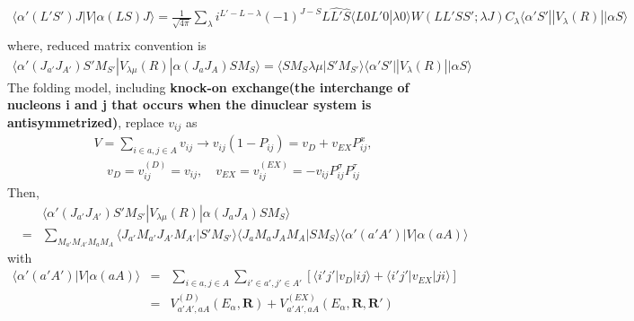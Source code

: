 \documentclass[11pt]{book}
\def\bm{\boldsymbol}
\def\vR{{\bm R}}
\def\la{\langle}
\def\ra{\rangle}
\newcommand{\bea}{\begin{eqnarray}}
\newcommand{\eea}{\end{eqnarray}}
\newcommand{\no}{\nonumber \\}
\begin{document}
\bea 
\la \alpha'(L'S')J|V|\alpha(LS)J\ra 
=\frac{1}{\sqrt{4\pi}}\sum_{\lambda} i^{L'-L-\lambda}(-1)^{J-S}\hat{L}\hat{L'}\hat{S}
 \la L 0 L' 0|\lambda 0\ra W(LL'SS';\lambda J) C_\lambda \la \alpha' S'||V_\lambda(R)||\alpha S\ra 
 \no 
\eea 
where, reduced matrix convention is 
\bea 
\la \alpha'(J_{a'}J_{A'})S' M_{S'}|V_{\lambda \mu}(R)|\alpha(J_a J_A) S M_S\ra 
=\la S M_S \lambda \mu|S' M_{S'}\ra 
  \la \alpha' S'||V_\lambda(R)||\alpha S\ra 
\eea 
The folding model, including {\bf knock-on exchange(the interchange of nucleons i and j that occurs when the dinuclear system is antisymmetrized)}, replace $v_{ij}$ as  
\bea 
V=\sum_{i\in a,j\in A} v_{ij} \to v_{ij}(1-P_{ij})=v_D+v_{EX} P^x_{ij}, 
\eea 
\bea 
v_D=v_{ij}^{(D)}=v_{ij},\quad v_{EX}=v_{ij}^{(EX)}=-v_{ij}P^\sigma_{ij} P^\tau_{ij}
\eea 
Then,
\bea 
& &\la \alpha'(J_{a'}J_{A'})S' M_{S'}|V_{\lambda \mu}(R)|\alpha(J_a J_A) S M_S\ra 
\no 
&=&\sum_{M_{a'} M_{A'} M_a M_A}
 \la J_{a'} M_{a'} J_{A'} M_{A'}|S' M_{S'}\ra \la J_{a} M_{a} J_{A} M_{A}|S M_{S}\ra
 \la \alpha'(a'A')|V|\alpha(a A)\ra 
\eea 
with
\bea 
\la \alpha'(a' A')|V|\alpha(aA)\ra 
&=& \sum_{i\in a, j\in A}\sum_{i'\in a',j'\in A'}
    [\la i'j'|v_D|ij\ra +\la i' j'|v_{EX}|ji\ra ] \no 
&=& V^{(D)}_{a'A',aA}(E_\alpha,\vR)+    V^{(EX)}_{a'A',aA}(E_\alpha,\vR,\vR')
\eea 
\end{document}
